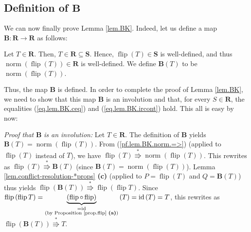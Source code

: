 \documentclass[numbers=enddot,12pt,final,onecolumn,notitlepage]{scrartcl}%
\theoremstyle{definition}
\begin{document}
\subsection{Definition of $\mathbf{B}$}

We can now finally prove Lemma \ref{lem.BK}. Indeed, let us define a map
$\mathbf{B}:\mathbf{R}\rightarrow\mathbf{R}$ as follows:

Let $T\in\mathbf{R}$. Then, $T\in\mathbf{R}\subseteq\mathbf{S}$. Hence,
$\operatorname*{flip}\left(  T\right)  \in\mathbf{S}$ is well-defined, and
thus $\operatorname*{norm}\left(  \operatorname*{flip}\left(  T\right)
\right)  \in\mathbf{R}$ is well-defined. We define $\mathbf{B}\left(
T\right)  $ to be $\operatorname*{norm}\left(  \operatorname*{flip}\left(
T\right)  \right)  $.

Thus, the map $\mathbf{B}$ is defined. In order to complete the proof of Lemma
\ref{lem.BK}, we need to show that this map $\mathbf{B}$ is an involution and
that, for every $S\in\mathbf{R}$, the equalities (\ref{eq.lem.BK.ceq}) and
(\ref{eq.lem.BK.ircont}) hold. This all is easy by now:

\textit{Proof that }$\mathbf{B}$ \textit{is an involution:} Let $T\in
\mathbf{R}$. The definition of $\mathbf{B}$ yields $\mathbf{B}\left(
T\right)  =\operatorname*{norm}\left(  \operatorname*{flip}\left(  T\right)
\right)  $. From (\ref{pf.lem.BK.norm.=>}) (applied to $\operatorname*{flip}%
\left(  T\right)  $ instead of $T$), we have $\operatorname*{flip}\left(
T\right)  \overset{\ast}{\Rrightarrow}\operatorname*{norm}\left(
\operatorname*{flip}\left(  T\right)  \right)  $. This rewrites as
$\operatorname*{flip}\left(  T\right)  \overset{\ast}{\Rrightarrow}%
\mathbf{B}\left(  T\right)  $ (since $\mathbf{B}\left(  T\right)
=\operatorname*{norm}\left(  \operatorname*{flip}\left(  T\right)  \right)
$). Lemma \ref{lem.conflict-resolution-*props} \textbf{(c)} (applied to
$P=\operatorname*{flip}\left(  T\right)  $ and $Q=\mathbf{B}\left(  T\right)
$) thus yields $\operatorname*{flip}\left(  \mathbf{B}\left(  T\right)
\right)  \overset{\ast}{\Rrightarrow}\operatorname*{flip}\left(
\operatorname*{flip}T\right)  $. Since $\operatorname*{flip}\left(
\operatorname*{flip}T\right)  =\underbrace{\left(  \operatorname*{flip}%
\circ\operatorname*{flip}\right)  }_{\substack{=\operatorname*{id}\\\text{(by
Proposition \ref{prop.flip} \textbf{(a)})}}}\left(  T\right)
=\operatorname*{id}\left(  T\right)  =T$, this rewrites as
$\operatorname*{flip}\left(  \mathbf{B}\left(  T\right)  \right)
\overset{\ast}{\Rrightarrow}T$.
\end{document}
